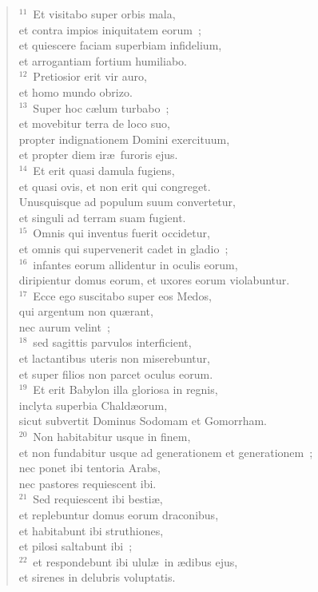 \begin{flushleft}
\begin{verse}
${}^{11}$~Et visitabo super orbis mala,\\ et contra impios iniquitatem eorum~;\\ et quiescere faciam superbiam infidelium,\\ et arrogantiam fortium humiliabo.\\
${}^{12}$~Pretiosior erit vir auro,\\ et homo mundo obrizo.\\
${}^{13}$~Super hoc c\ae lum turbabo~;\\ et movebitur terra de loco suo,\\ propter indignationem Domini exercituum,\\ et propter diem ir\ae\ furoris ejus.\\
${}^{14}$~Et erit quasi damula fugiens,\\ et quasi ovis, et non erit qui congreget.\\ Unusquisque ad populum suum convertetur,\\ et singuli ad terram suam fugient.\\
${}^{15}$~Omnis qui inventus fuerit occidetur,\\ et omnis qui supervenerit cadet in gladio~;\\
${}^{16}$~infantes eorum allidentur in oculis eorum,\\ diripientur domus eorum, et uxores eorum violabuntur.\\
${}^{17}$~Ecce ego suscitabo super eos Medos,\\ qui argentum non qu\ae rant,\\ nec aurum velint~;\\
${}^{18}$~sed sagittis parvulos interficient,\\ et lactantibus uteris non miserebuntur,\\ et super filios non parcet oculus eorum.\\
${}^{19}$~Et erit Babylon illa gloriosa in regnis,\\ inclyta superbia Chald\ae orum,\\ sicut subvertit Dominus Sodomam et Gomorrham.\\
${}^{20}$~Non habitabitur usque in finem,\\ et non fundabitur usque ad generationem et generationem~;\\ nec ponet ibi tentoria Arabs,\\ nec pastores requiescent ibi.\\
${}^{21}$~Sed requiescent ibi besti\ae ,\\ et replebuntur domus eorum draconibus,\\ et habitabunt ibi struthiones,\\ et pilosi saltabunt ibi~;\\
${}^{22}$~et respondebunt ibi ulul\ae\ in \ae dibus ejus,\\ et sirenes in delubris voluptatis.\end{verse}\end{flushleft}


